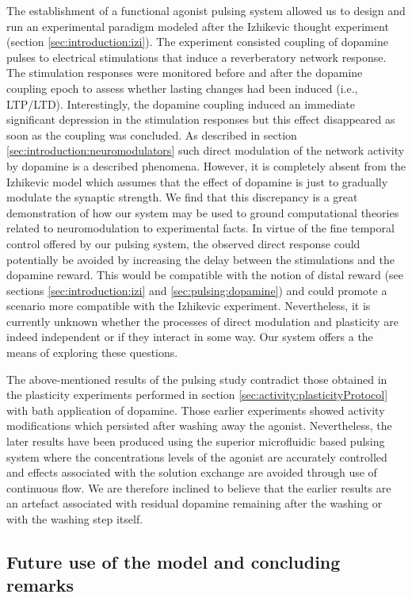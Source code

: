 The establishment of a functional agonist pulsing system allowed us to design and run an experimental paradigm modeled after the Izhikevic thought experiment (section \ref{sec:introduction:izi}). The experiment consisted coupling of dopamine pulses to electrical stimulations that induce a reverberatory network response. The stimulation responses were monitored before and after the dopamine coupling epoch to assess whether lasting changes had been induced (i.e., LTP/LTD). Interestingly, the dopamine coupling induced an immediate significant depression in the stimulation responses but this effect disappeared as soon as the coupling was concluded. As described in section \ref{sec:introduction:neuromodulators} such direct modulation of the network activity by dopamine is a described phenomena. However, it is completely absent from the Izhikevic model which assumes that the effect of dopamine is just to gradually modulate the synaptic strength. We find that this discrepancy is a great demonstration of how our system may be used to ground computational theories related to neuromodulation to experimental facts. In virtue of the fine temporal control offered by our pulsing system, the observed direct response could potentially be avoided by increasing the delay between the stimulations and the dopamine reward. This would be compatible with the notion of distal reward (see sections \ref{sec:introduction:izi} and \ref{sec:pulsing:dopamine}) and could promote a scenario more compatible with the Izhikevic experiment. Nevertheless, it is currently unknown whether the processes of direct modulation and plasticity are indeed independent or if they interact in some way. Our system offers a the means of exploring these questions.

The above-mentioned results of the pulsing study contradict those obtained in the plasticity experiments performed in section \ref{sec:activity:plasticityProtocol} with bath application of dopamine. Those earlier experiments showed activity modifications which persisted after washing away the agonist. Nevertheless, the later results have been produced using the superior microfluidic based pulsing system where the concentrations levels of the agonist are accurately controlled and effects associated with the solution exchange are avoided through use of continuous flow. We are therefore inclined to believe that the earlier results are an artefact associated with residual dopamine remaining after the washing or with the washing step itself.

\subsection{Future use of the model and concluding remarks}


